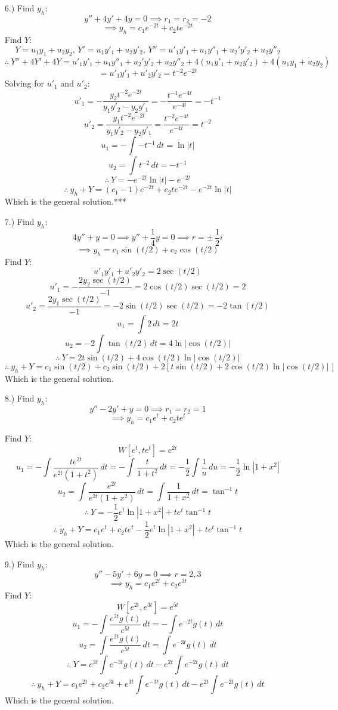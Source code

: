 \documentclass[12pt]{article}
\newcommand{\vertb}[1]{\left\vert#1\right\vert}
\newcommand{\bracks}[1]{\left[#1\right]}
\begin{document}
\begin{itemize}
    \item [6.)] Find $y_h$:
    \[y''+4y'+4y=0\implies r_1=r_2=-2\]
    \[\implies y_h=c_1e^{-2t}+c_2te^{-2t}\]
    Find $Y$:
    \[Y=u_1y_1+u_2y_2,\,Y'=u_1y'_1+u_2y'_2,\,Y''=u'_1y'_1+u_1y''_1+u_2'y'_2+u_2y''_2\]
    \[\therefore\ Y''+4Y'+4Y=u'_1y'_1+u_1y''_1+u_2'y'_2+u_2y''_2+4(u_1y'_1+u_2y'_2)+4(u_1y_1+u_2y_2)\]
    \[=u'_1y'_1+u'_2y'_2=t^{-2}e^{-2t}\]
    Solving for $u'_1$ and $u'_2$:
    \[u'_1=-\frac{y_2t^{-2}e^{-2t}}{y_1y'_2-y_2y'_1}=-\frac{t^{-1}e^{-4t}}{e^{-4t}}=-t^{-1}\]
    \[u'_2=\frac{y_1t^{-2}e^{-2t}}{y_1y'_2-y_2y'_1}=\frac{t^{-2}e^{-4t}}{e^{-4t}}=t^{-2}\]
    \[u_1=-\int-t^{-1}\,dt=\ln\vert t\vert\]
    \[u_2=\int t^{-2}\,dt=-t^{-1}\]
    \[\therefore\ Y=-e^{-2t}\ln\vert t\vert-e^{-2t}\]
    \[\therefore\ y_h+Y=(c_1-1)e^{-2t}+c_2te^{-2t}-e^{-2t}\ln\vert t\vert\]
    Which is the general solution.***

    \item [7.)] Find $y_h$:
    \[4y''+y=0\implies y''+\frac{1}{4}y=0\implies r=\pm\,\frac{1}{2}i\]
    \[\implies y_h=c_1\sin(t/2)+c_2\cos(t/2)\]
    Find $Y$:
    \[u'_1y'_1+u'_2y'_2=2\sec(t/2)\]
    \[u'_1=-\frac{2y_2\sec(t/2)}{-1}=2\cos(t/2)\sec(t/2)=2\]
    \[u'_2=\frac{2y_1\sec(t/2)}{-1}=-2\sin(t/2)\sec(t/2)=-2\tan(t/2)\]
    \[u_1=\int2\,dt=2t\]
    \[u_2=-2\int\tan(t/2)\,dt=4\ln\vert\cos(t/2)\vert\]
    \[\therefore\ Y=2t\sin(t/2)+4\cos(t/2)\ln\vert\cos(t/2)\vert\]
    \[\therefore\ y_h+Y=c_1\sin(t/2)+c_2\sin(t/2)+2\bracks{t\sin(t/2)+2\cos(t/2)\ln\vertb{\cos(t/2)}\,}\]
    Which is the general solution.

    \item [8.)] Find $y_h$:
    \[y''-2y'+y=0\implies r_1=r_2=1\]
    \[\implies y_h=c_1e^{t}+c_2te^{t}\]

    \pagebreak
    Find $Y$:
    \[W[e^t,te^t]=e^{2t}\]
    \[u_1=-\int\frac{te^{2t}}{e^{2t}(1+t^2)}\,dt=-\int\frac{t}{1+t^2}\,dt=-\frac{1}{2}\int\frac{1}{u}\,du=-\frac{1}{2}\ln\vertb{1+x^2}\]
    \[u_2=\int\frac{e^{2t}}{e^{2t}(1+x^2)}\,dt=\int\frac{1}{1+x^2}\,dt=\tan^{-1}t\]
    \[\therefore\ Y=-\frac{1}{2}e^t\ln\vertb{1+x^2}+te^t\tan^{-1}t\]
    \[\therefore\ y_h+Y=c_1e^t+c_2te^t-\frac{1}{2}e^t\ln\vertb{1+x^2}+te^t\tan^{-1}t\]
    Which is the general solution.

    \item [9.)] Find $y_h$:
    \[y''-5y'+6y=0\implies r=2,3\]
    \[\implies y_h=c_1e^{2t}+c_2e^{3t}\]
    Find $Y$:
    \[W[e^{2t},e^{3t}]=e^{5t}\]
    \[u_1=-\int\frac{e^{3t}g(t)}{e^{5t}}\,dt=-\int e^{-2t}g(t)\,dt\]
    \[u_2=\int\frac{e^{2t}g(t)}{e^{5t}}\,dt=\int e^{-3t}g(t)\,dt\]
    \[\therefore\ Y=e^{3t}\int e^{-3t}g(t)\,dt-e^{2t}\int e^{-2t}g(t)\,dt\]
    \[\therefore\ y_h+Y=c_1e^{2t}+c_2e^{3t}+e^{3t}\int e^{-3t}g(t)\,dt-e^{2t}\int e^{-2t}g(t)\,dt\]
    Which is the general solution.
    

\end{itemize}
\end{document}
